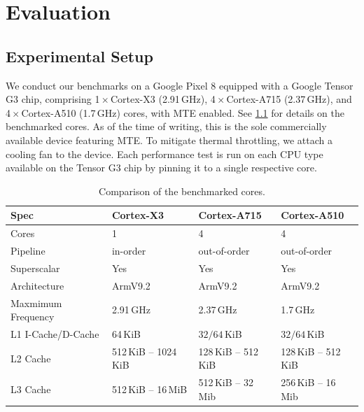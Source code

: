 \chapter{Evaluation}
\label{ch:eval}


\section{Experimental Setup}\label{sec:experimental-setup}

We conduct our benchmarks on a Google Pixel 8 equipped with a Google Tensor G3 chip, comprising 1\,$\times$\,Cortex-X3 (2.91\,GHz), 4\,$\times$\,Cortex-A715 (2.37\,GHz), and 4\,$\times$\,Cortex-A510 (1.7\,GHz) cores, with \ac{MTE} enabled.
See \cref{tab:cores-comparison} for details on the benchmarked cores.
As of the time of writing, this is the sole commercially available device featuring \ac{MTE}.
To mitigate thermal throttling, we attach a cooling fan to the device.
Each performance test is run on each CPU type available on the Tensor G3 chip by pinning it to a single respective core.


\begin{table}[ht]
    \centering
    \small
    \begin{tabular}{l || l | l | l}
        \textbf{Spec}      & \textbf{Cortex-X3}    & \textbf{Cortex-A715} & \textbf{Cortex-A510} \\
        \hline
        Cores              & 1                     & 4                    & 4                    \\
        Pipeline           & in-order              & out-of-order         & out-of-order         \\
        Superscalar        & Yes                   & Yes                  & Yes                  \\
        Architecture       & ArmV9.2               & ArmV9.2              & ArmV9.2              \\
        Maxmimum Frequency & 2.91\,GHz             & 2.37\,GHz            & 1.7\,GHz             \\
        L1 I-Cache/D-Cache & 64\,KiB               & $32/64$\,KiB         & $32/64$\,KiB         \\
        L2 Cache           & 512\,KiB -- 1024\,KiB & 128\,KiB -- 512\,KiB & 128\,KiB -- 512\,KiB \\
        L3 Cache           & 512\,KiB -- 16\,MiB   & 512\,KiB -- 32\,Mib  & 256\,KiB -- 16\,Mib  \\
    \end{tabular}
    \caption{Comparison of the benchmarked cores.}
    \label{tab:cores-comparison}
\end{table}


